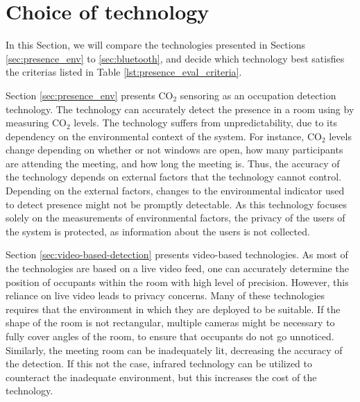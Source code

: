 \section{Choice of technology}
In this Section, we will compare the technologies presented in Sections \ref{sec:presence_env} to \ref{sec:bluetooth}, and decide which technology best satisfies the criterias listed in Table \ref{lst:presence_eval_criteria}. 

Section \ref{sec:presence_env} presents $\text{CO}_{2}$ sensoring as an occupation detection technology. The technology can accurately detect the presence in a room using by measuring $\text{CO}_{2}$ levels.
The technology suffers from unpredictability, due to its dependency on the environmental context of the system.
For instance, $\text{CO}_{2}$ levels change depending on whether or not windows are open, how many participants are attending the meeting, and how long the meeting is.
Thus, the accuracy of the technology depends on external factors that the technology cannot control.
Depending on the external factors, changes to the environmental indicator used to detect presence might not be promptly detectable.
As this technology focuses solely on the measurements of environmental factors, the privacy of the users of the system is protected, as information about the users is not collected.

Section \ref{sec:video-based-detection} presents video-based technologies.
As most of the technologies are based on a live video feed, one can accurately determine the position of occupants within the room with high level of precision. 
However, this reliance on live video leads to privacy concerns.
Many of these technologies requires that the environment in which they are deployed to be suitable.
If the shape of the room is not rectangular, multiple cameras might be necessary to fully cover angles of the room, to ensure that occupants do not go unnoticed. 
Similarly, the meeting room can be inadequately lit, decreasing the accuracy of the detection.
If this not the case, infrared technology can be utilized to counteract the inadequate environment, but this increases the cost of the technology.   

